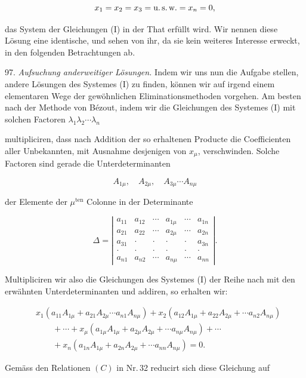 \[
x_1=x_2=x_3= \text{u.\,s.\,w.} =x_n=0,
\]

das System der Gleichungen (I) in der That erfüllt wird. Wir nennen diese
Lösung eine identische, und sehen von ihr, da sie kein weiteres Interesse
erweckt, in den folgenden Betrachtungen ab.

97. \textit{Aufsuchung anderweitiger Lösungen.} Indem wir uns nun die
Aufgabe stellen, andere Lösungen des Systemes (I) zu finden, können wir
auf irgend einem elementaren Wege der gewöhnlichen Eliminationsmethoden
vorgehen. Am besten nach der Methode von Bézout, indem wir die
Gleichungen des Systemes (I) mit solchen Factoren $\lambda_1\lambda_2\cdots\lambda_n$


multipliciren, dass nach Addition der so erhaltenen Producte die
Coefficienten aller Unbekannten, mit Ausnahme desjenigen von $x_\mu$,
verschwinden. Solche Factoren sind gerade die Unterdeterminanten

\[
A_{1\mu},\quad A_{2\mu},\quad A_{3\mu}\cdots A_{n\mu}
\]

der Elemente der $\mu^{\text{ten}}$ Colonne in der Determinante

\[
\Delta=
\left|
\begin{array}{cccccc}
a_{11} & a_{12} & \cdots & a_{1\mu} & \cdots & a_{1n}\\
a_{21} & a_{22} & \cdots & a_{2\mu} & \cdots & a_{2n}\\
a_{31} & \cdot & \cdot & \cdot & \cdot & a_{3n}\\
\cdot & \cdot & \cdot & \cdot & \cdot & \cdot\\
a_{n1} & a_{n2} & \cdots & a_{n\mu} & \cdots & a_{nn}
\end{array}
\right|.
\]

Multipliciren wir also die Gleichungen des Systemes (I) der Reihe nach
mit den erwähnten Unterdeterminanten und addiren, so erhalten wir:

\[
\begin{aligned}
&x_1(a_{11}A_{1\mu}+a_{21}A_{2\mu}\cdots a_{n1}A_{n\mu})+x_2(a_{12}A_{1\mu}+a_{22}A_{2\mu}+\cdots a_{n2}A_{n\mu})\\
&\qquad+\cdots+x_\mu(a_{1\mu}A_{1\mu}+a_{2\mu}A_{2\mu}+\cdots a_{n\mu}A_{n\mu})+\cdots\\
&\qquad+x_n(a_{1n}A_{1\mu}+a_{2n}A_{2\mu}+\cdots a_{nn}A_{n\mu})=0.
\end{aligned}
\]

Gemäss den Relationen $(C)$ in Nr.\,32 reducirt sich diese Gleichung auf

